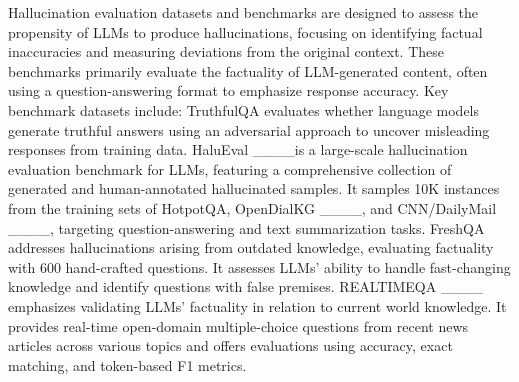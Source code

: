 Hallucination evaluation datasets and benchmarks are designed to assess the propensity of LLMs to produce hallucinations, focusing on identifying factual inaccuracies and measuring deviations from the original context. These benchmarks primarily evaluate the factuality of LLM-generated content, often using a question-answering format to emphasize response accuracy. Key benchmark datasets include: TruthfulQA evaluates whether language models generate truthful answers using an adversarial approach to uncover misleading responses from training data. HaluEval ____is a large-scale hallucination evaluation benchmark for LLMs, featuring a comprehensive collection of generated and human-annotated hallucinated samples. It samples 10K instances from the training sets of HotpotQA, OpenDialKG ____, and CNN/DailyMail ____, targeting question-answering and text summarization tasks. FreshQA addresses hallucinations arising from outdated knowledge, evaluating factuality with 600 hand-crafted questions. It assesses LLMs' ability to handle fast-changing knowledge and identify questions with false premises. REALTIMEQA ____ emphasizes validating LLMs' factuality in relation to current world knowledge. It provides real-time open-domain multiple-choice questions from recent news articles across various topics and offers evaluations using accuracy, exact matching, and token-based F1 metrics.